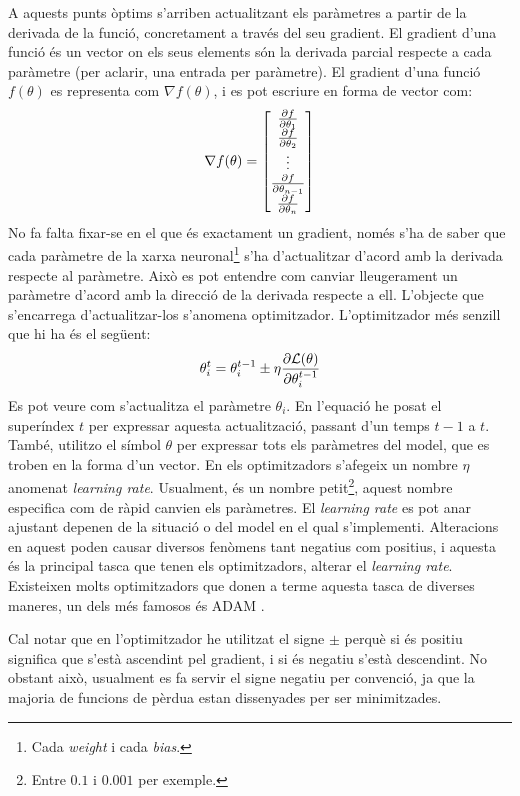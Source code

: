 A aquests punts òptims s'arriben actualitzant els paràmetres a partir de la derivada de la funció, concretament a través del seu gradient. El gradient d'una funció és un vector on els seus elements són la derivada parcial respecte a cada paràmetre (per aclarir, una entrada per paràmetre). El gradient d'una funció $f(\theta)$ es representa com $\nabla f(\theta)$, i es pot escriure en forma de vector com:
$$
\nabla f(\theta) = \begin{bmatrix}
	\pdv{f}{\theta_1} \\
	\pdv{f}{\theta_2} \\
	\vdots \\
	\pdv{f}{\theta_{n-1}} \\
	\pdv{f}{\theta_{n}}
\end{bmatrix}
$$
No fa falta fixar-se en el que és exactament un gradient, només s'ha de saber que cada paràmetre de la xarxa neuronal\footnote{Cada \textit{weight} i cada \textit{bias}.} s'ha d'actualitzar d'acord amb la derivada respecte al paràmetre. Això es pot entendre com canviar lleugerament un paràmetre d'acord amb la direcció de la derivada respecte a ell. L'objecte que s'encarrega d'actualitzar-los s'anomena optimitzador. L'optimitzador més senzill que hi ha és el següent:
\begin{equation}
	\theta_{i}^t = \theta_{i}^{t-1} \pm \eta\pdv{\mathcal{L}(\theta)}{\theta_{i}^{t-1}}
	\label{eq:optimizator}
\end{equation}
Es pot veure com s'actualitza el paràmetre $\theta_i$. En l'equació he posat el superíndex $t$ per expressar aquesta actualització, passant d'un temps $t-1$ a $t$. També, utilitzo el símbol $\theta$ per expressar tots els paràmetres del model, que es troben en la forma d'un vector. En els optimitzadors s'afegeix un nombre $\eta$ anomenat \textit{learning rate}. Usualment, és un nombre petit\footnote{Entre $0.1$ i $0.001$ per exemple.}, aquest nombre especifica com de ràpid canvien els paràmetres. El \textit{learning rate} es pot anar ajustant depenen de la situació o del model en el qual s'implementi. Alteracions en aquest poden causar diversos fenòmens tant negatius com positius, i aquesta és la principal tasca que tenen els optimitzadors, alterar el \textit{learning rate}. Existeixen molts optimitzadors que donen a terme aquesta tasca de diverses maneres, un dels més famosos és ADAM \cite{adam}. 

Cal notar que en l'optimitzador he utilitzat el signe $\pm$ perquè si és positiu significa que s'està ascendint pel gradient, i si és negatiu s'està descendint. No obstant això, usualment es fa servir el signe negatiu per convenció, ja que la majoria de funcions de pèrdua estan dissenyades per ser minimitzades. 


